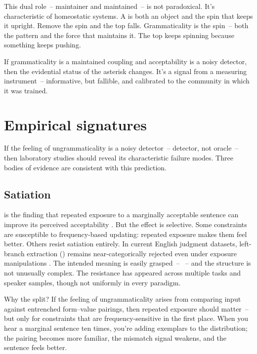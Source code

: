 This dual role~-- maintainer and maintained~-- is not paradoxical. It's characteristic of homeostatic systems. A  is both an object and the spin that keeps it upright. Remove the spin and the top falls. Grammaticality is the spin~-- both the pattern and the force that maintains it. The top keeps spinning because something keeps pushing.

If grammaticality is a maintained coupling and acceptability is a noisy detector, then the evidential status of the asterisk changes. It's a signal from a measuring instrument~-- informative, but fallible, and calibrated to the community in which it was trained.


\section{Empirical signatures}
\label{sec:14:empirical}

If the feeling of ungrammaticality is a noisy detector~-- detector, not oracle~-- then laboratory studies should reveal its characteristic failure modes. Three bodies of evidence are consistent with this prediction.

\subsection{Satiation}
\label{sec:14:satiation}

 is the finding that repeated exposure to a marginally acceptable sentence can improve its perceived acceptability \parencite{snyder2000grammaticality}. But the effect is selective. Some constraints are susceptible to frequency-based updating: repeated exposure makes them feel better. Others resist satiation entirely. In current English judgment datasets, left-branch extraction (\ungram{}) remains near-categorically rejected even under exposure manipulations \parencite{Snyder2022}. The intended meaning is easily grasped~-- ~-- and the structure is not unusually complex. The resistance has appeared across multiple tasks and speaker samples, though not uniformly in every paradigm.

Why the split? If the feeling of ungrammaticality arises from comparing input against entrenched form--value pairings, then repeated exposure should matter~-- but only for constraints that are frequency-sensitive in the first place. When you hear a marginal sentence ten times, you're adding exemplars to the distribution; the pairing becomes more familiar, the mismatch signal weakens, and the sentence feels better. 

